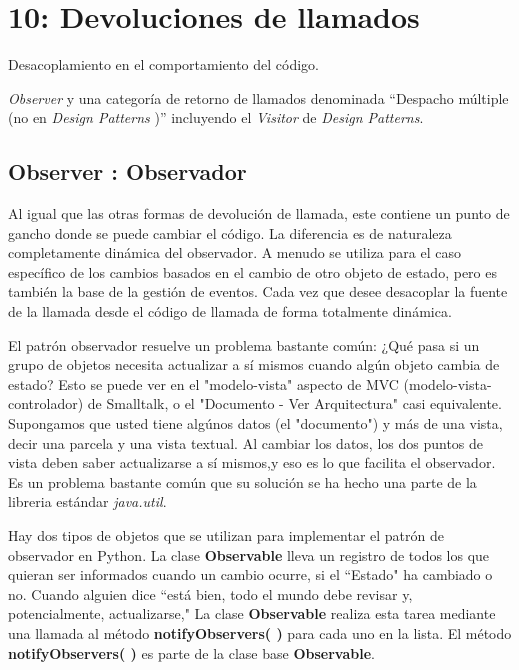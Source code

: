 
\section*{10: Devoluciones de llamados}
\label{sec:ddl}

Desacoplamiento en el comportamiento del código.  \newline

\textit{Observer} y una categoría de retorno de llamados denominada “Despacho múltiple (no en \textit{Design Patterns} )” incluyendo el \textit{Visitor} de \textit{Design Patterns}.   \newline

\subsection*{Observer : Observador}
\label{subsec:Observer}

Al igual que las otras formas de devolución de llamada, este contiene un punto de gancho donde se puede cambiar el código. La diferencia es de naturaleza completamente dinámica del observador. A menudo se utiliza para el caso específico de los cambios basados en el cambio de otro objeto de estado, pero es también la base de la gestión de eventos. Cada vez que desee desacoplar la fuente de la llamada desde el código de llamada de forma totalmente dinámica.     \newline

El patrón observador resuelve un problema bastante común: ¿Qué pasa si un grupo de objetos necesita actualizar a sí mismos cuando algún objeto cambia de estado? Esto se puede ver en el "modelo-vista" aspecto de MVC (modelo-vista-controlador) de Smalltalk, o el "Documento - Ver Arquitectura" casi equivalente. Supongamos que usted tiene algúnos datos (el "documento") y más de una vista, decir una parcela y una vista textual. Al cambiar los datos, los dos puntos de vista deben saber actualizarse a sí mismos,y eso es lo que facilita el observador. Es un problema bastante común que su solución se ha hecho una parte de la libreria  estándar \textit{java.util}. \newline

Hay dos tipos de objetos que se utilizan para implementar el patrón de observador en Python. La clase \textbf{Observable} lleva un registro de todos los que quieran ser informados cuando un cambio ocurre, si el “Estado" ha cambiado o no. Cuando alguien dice “está bien, todo el mundo debe revisar y, potencialmente, actualizarse," La clase \textbf{Observable} realiza esta tarea mediante una llamada al método \textbf{notifyObservers( )} para cada uno en la lista. El método \textbf{notifyObservers( )} es parte de la clase base \textbf{Observable}.   \newline

